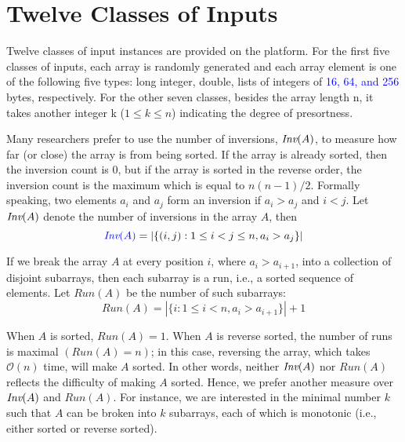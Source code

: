 \documentclass[AMA,STIX1COL]{WileyNJD-v2}
\newcommand{\qusort}{\emph{quicksort }}
\newcommand{\msort}{\emph{mergesort }}
\begin{document}

\section{Twelve Classes of Inputs}
Twelve classes of input instances are provided on the platform.
For the first five classes of inputs, each array is randomly generated and each array element is one of the following five types: long integer, double, lists of integers of \textcolor{blue}{16, 64, and 256} bytes, respectively. 
For the other seven classes, besides the array length n, it takes another integer k ($1 \leq k \leq n$) indicating the degree of presortness.  

Many researchers prefer to use the number of inversions, \textcolor{blue}{$\mbox{\it Inv}(A)$}, 
to measure how far (or close) the array is from being sorted. If the array is already sorted, then the inversion count is 0, but if the array is sorted in the reverse order, the inversion count is the maximum which is equal to $n(n-1)/2$. Formally speaking, two elements $a_i$ and $a_j$ form an inversion if $a_i > a_j$ and $i < j$. Let \textcolor{blue}{$\mbox{\it Inv}(A)$} denote the number of inversions in the array $A$, then
\[ \textcolor{blue}{\mbox{\it Inv}(A)} = | \{(i, j) : 1 \leq i < j \leq n, a_i > a_j\} | \]            

If we break the array $A$ at every position $i$, where $a_i > a_{i+1}$, into a collection of disjoint subarrays, then each subarray is a run, i.e., a sorted sequence of elements.  
Let $Run(A)$ be the number of such subarrays: 
\[ Run(A) = | \{i : 1 \leq i < n, a_i > a_{i+1}\} | + 1 \]     

When $A$ is sorted, $Run(A) = 1$. When $A$ is reverse sorted, the number of runs is maximal $(Run(A) = n)$; in this case, reversing the array, which takes $\mathcal{O}(n)$ time, will make $A$ sorted. 
In other words, neither \textcolor{blue}{$\mbox{\it Inv}(A)$} nor $Run(A)$ reflects the difficulty of making $A$ sorted. 
Hence, we prefer another measure over \textcolor{blue}{$\mbox{\it Inv}(A)$} and $Run(A)$. 
For instance, we are interested in the minimal number $k$ such that $A$ can be broken into $k$ subarrays, each of which is monotonic (i.e., either sorted or reverse sorted).       
\end{document}
